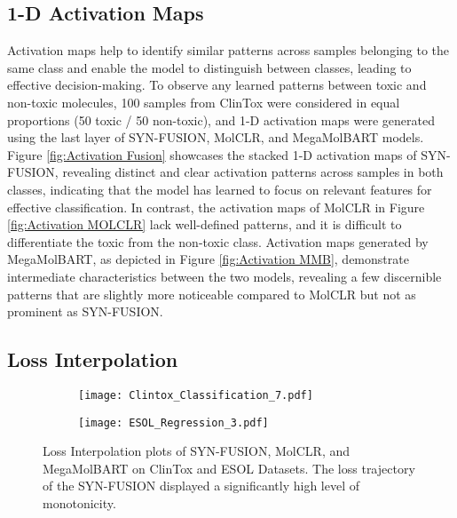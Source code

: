 \documentclass[sigconf,nonacm]{acmart}
\begin{document}
\subsection{1-D Activation Maps}
Activation maps help to identify similar patterns across samples belonging to the same class and enable the model to distinguish between classes, leading to effective decision-making. To observe any learned patterns between toxic and non-toxic molecules, 100 samples from ClinTox were considered in equal proportions (50 toxic / 50 non-toxic), and 1-D activation maps were generated using the last layer of SYN-FUSION, MolCLR, and MegaMolBART models. 
Figure \ref{fig:Activation Fusion} showcases the stacked 1-D activation maps of SYN-FUSION, revealing distinct and clear activation patterns across samples in both classes, indicating that the model has learned to focus on relevant features for effective classification.
In contrast, the activation maps of MolCLR in Figure \ref{fig:Activation MOLCLR} lack well-defined patterns, and it is difficult to differentiate the toxic from the non-toxic class. Activation maps generated by MegaMolBART, as depicted in Figure \ref{fig:Activation MMB}, demonstrate intermediate characteristics between the two models, revealing a few discernible patterns that are slightly more noticeable compared to MolCLR but not as prominent as SYN-FUSION.


























\subsection{Loss Interpolation}
\label{loss-interpolation}
\begin{figure}
    \begin{subfigure}
    \centering
\texttt{[image: Clintox\_Classification\_7.pdf]}
    \end{subfigure}
    \begin{subfigure}
    \centering
\texttt{[image: ESOL\_Regression\_3.pdf]}
    \end{subfigure}
    \caption{Loss Interpolation plots of SYN-FUSION, MolCLR, and MegaMolBART on ClinTox and ESOL Datasets. The loss trajectory of the SYN-FUSION displayed a significantly high level of monotonicity.}
    \label{fig:loss interpolation}
\end{figure}
\end{document}
